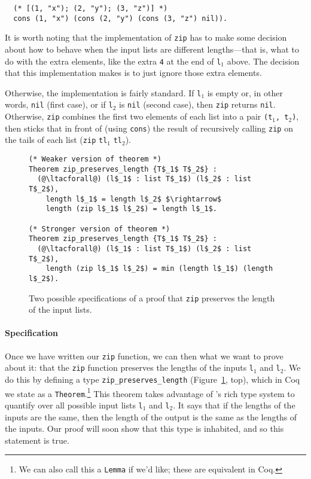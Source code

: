 \begin{lstlisting}
  (* [(1, "x"); (2, "y"); (3, "z")] *)
  cons (1, "x") (cons (2, "y") (cons (3, "z") nil)).
\end{lstlisting}

It is worth noting that the implementation of \lstinline{zip} has to make some decision about
how to behave when the input lists are different lengths---that is, what to do with the extra elements,
like the extra \lstinline{4} at the end of \lstinline{l}$_1$ above.
The decision that this implementation makes is to just ignore those extra elements.

Otherwise, the implementation is fairly standard.
If \lstinline{l}$_1$ is empty or, in other words, \lstinline{nil} (first case),
or if \lstinline{l}$_2$ is \lstinline{nil} (second case), 
then \lstinline{zip} returns \lstinline{nil}.
Otherwise,
\lstinline{zip} combines the first two elements of each list into a pair \lstinline{(t}$_1$\lstinline{, t}$_2$\lstinline{)},
then sticks that in front of (using \lstinline{cons}) the result of recursively calling \lstinline{zip} on the tails of each list
(\lstinline{zip} \lstinline{tl}$_1$ \lstinline{tl}$_2$). %

\begin{figure}
\begin{lstlisting}
(* Weaker version of theorem *)
Theorem zip_preserves_length {T$_1$ T$_2$} :
  (@\ltacforall@) (l$_1$ : list T$_1$) (l$_2$ : list T$_2$),
    length l$_1$ = length l$_2$ $\rightarrow$
    length (zip l$_1$ l$_2$) = length l$_1$.

(* Stronger version of theorem *)
Theorem zip_preserves_length {T$_1$ T$_2$} :
  (@\ltacforall@) (l$_1$ : list T$_1$) (l$_2$ : list T$_2$),
    length (zip l$_1$ l$_2$) = min (length l$_1$) (length l$_2$).
\end{lstlisting}
\caption{Two possible specifications of a proof that \lstinline{zip} preserves the length of the input lists.}
\label{fig:zip-pres}
\end{figure}

\paragraph{Specification} Once we have written our \lstinline{zip} function, we can then  what we 
want to prove about it: that the \lstinline{zip} function preserves the lengths of the inputs \lstinline{l}$_1$ and \lstinline{l}$_2$.
We do this by defining a type \lstinline{zip_preserves_length} (Figure~\ref{fig:zip-pres}, top), which in Coq 
we state as a \lstinline{Theorem}.\footnote{We can also call this a \lstinline{Lemma} if we'd like; these are equivalent in Coq.}
This theorem takes advantage of 's rich type system to quantify over all possible input lists \lstinline{l}$_1$ and \lstinline{l}$_2$.
It says that if the lengths of the inputs are the same, then the length of the output is the same as the lengths of the inputs.
Our proof will soon show that this type is inhabited, and so this statement is true.

